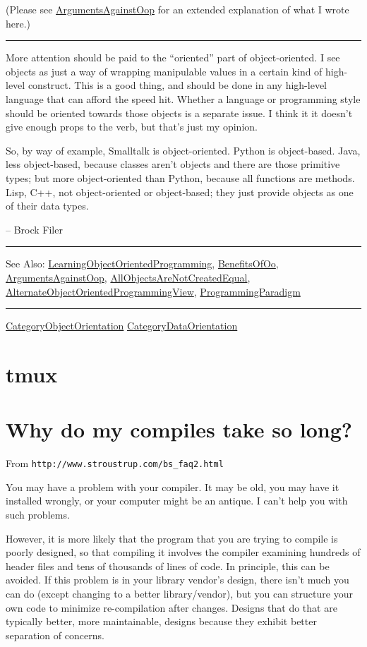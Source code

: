 \documentclass[10pt,twoside,openright]{memoir}
\begin{document}
(Please see \ul{ArgumentsAgainstOop} for an extended explanation of what I wrote here.)

\vskip 0.1in
\hrule
\vskip 0.1in

More attention should be paid to the ``oriented'' part of object-oriented. I see objects as just a way of wrapping manipulable values in a certain kind of high-level construct. This is a good thing, and should be done in any high-level language that can afford the speed hit. Whether a language or programming style should be oriented towards those objects is a separate issue. I think it it doesn't give enough props to the verb, but that's just my opinion.

So, by way of example, Smalltalk is object-oriented. Python is object-based. Java, less object-based, because classes aren't objects and there are those primitive types; but more object-oriented than Python, because all functions are methods. Lisp, C++, not object-oriented or object-based; they just provide objects as one of their data types.

-- Brock Filer

\vskip 0.1in
\hrule
\vskip 0.1in

See Also: \ul{LearningObjectOrientedProgramming}, \ul{BenefitsOfOo}, \ul{ArgumentsAgainstOop}, \ul{AllObjectsAreNotCreatedEqual}, \ul{AlternateObjectOrientedProgrammingView}, \ul{ProgrammingParadigm}

\vskip 0.1in
\hrule
\vskip 0.1in

\ul{CategoryObjectOrientation} \ul{CategoryDataOrientation}


\chapter{tmux}


\chapter{Why do my compiles take so long?}

From {\footnotesize\texttt{http://www.stroustrup.com/bs\_faq2.html}}

\vskip 0.2in

\noindent You may have a problem with your compiler. It may be old, you may have it installed wrongly, or your computer might be an antique. I can't help you with such problems.

However, it is more likely that the program that you are trying to compile is poorly designed, so that compiling it involves the compiler examining hundreds of header files and tens of thousands of lines of code. In principle, this can be avoided. If this problem is in your library vendor's design, there isn't much you can do (except changing to a better library/vendor), but you can structure your own code to minimize re-compilation after changes. Designs that do that are typically better, more maintainable, designs because they exhibit better separation of concerns.
\end{document}
